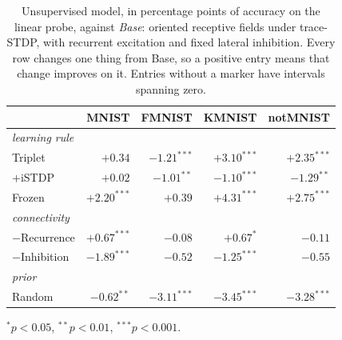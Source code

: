 \begin{table}[t]
\centering
\caption{Unsupervised model, in percentage points of accuracy on the linear probe,
against \textit{Base}: oriented receptive fields under trace-STDP, with recurrent excitation
and fixed lateral inhibition. Every row changes one thing from Base, so a positive
entry means that change improves on it. Entries without a marker have intervals spanning
zero.}
\label{tab:phase1}
\begin{tabular}{lrrrr}
\toprule
& MNIST & FMNIST & KMNIST & notMNIST \\
\midrule
\multicolumn{5}{l}{\emph{learning rule}} \\
Triplet & $+0.34$ & $-1.21^{***}$ & $+3.10^{***}$ & $+2.35^{***}$ \\
$+$iSTDP & $+0.02$ & $-1.01^{**}$ & $-1.10^{***}$ & $-1.29^{**}$ \\
Frozen & $+2.20^{***}$ & $+0.39$ & $+4.31^{***}$ & $+2.75^{***}$ \\
\multicolumn{5}{l}{\emph{connectivity}} \\
$-$Recurrence & $+0.67^{***}$ & $-0.08$ & $+0.67^{*}$ & $-0.11$ \\
$-$Inhibition & $-1.89^{***}$ & $-0.52$ & $-1.25^{***}$ & $-0.55$ \\
\multicolumn{5}{l}{\emph{prior}} \\
Random & $-0.62^{**}$ & $-3.11^{***}$ & $-3.45^{***}$ & $-3.28^{***}$ \\
\bottomrule
\end{tabular}

\footnotesize $^{*}p<0.05$, $^{**}p<0.01$, $^{***}p<0.001$.
\end{table}
